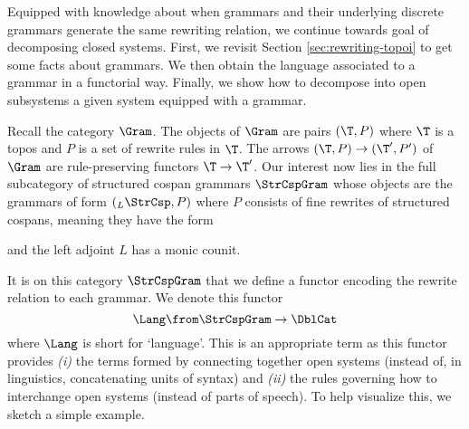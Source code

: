 Equipped with knowledge about when grammars and their
underlying discrete grammars generate the same rewriting
relation, we continue towards goal of decomposing closed
systems. First, we revisit Section \ref{sec:rewriting-topoi}
to get some facts about grammars. We then obtain the
language associated to a grammar in a functorial
way. Finally, we show how to decompose into open subsystems a given system
equipped with a grammar. 

Recall the category $ \Gram $.  The objects of $ \Gram $ are
pairs $ ( \T , P ) $ where $ \T $ is a topos and $ P $ is a
set of rewrite rules in $ \T $.  The arrows
$ (\T , P) \to ( \T' , P' )$ of $ \Gram $ are
rule-preserving functors $ \T \to \T' $.  Our interest now lies
in the full subcategory of structured cospan grammars
$ \StrCspGram $ whose objects are the grammars of form
$ ( _L \StrCsp , P ) $ where $ P $ consists of fine rewrites
of structured cospans, meaning they have the form
 \begin{center}
\end{center}
and the left adjoint $ L $ has a monic counit.

It is on this category $ \StrCspGram $ that we define a
functor encoding the rewrite relation to each grammar. We
denote this functor
\[
  \Lang \from \StrCspGram \to \DblCat
\]
where $ \Lang $ is short for `language'. This is an
appropriate term as this functor provides \emph{(i)} the
terms formed by connecting together open systems (instead
of, in linguistics, concatenating units of syntax) and
\emph{(ii)} the rules governing how to interchange open
systems (instead of parts of speech). To help visualize
this, we sketch a simple example.

